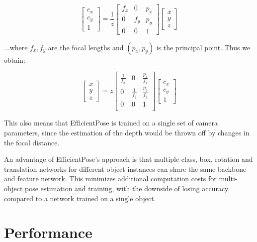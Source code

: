 \begin{equation}
    \begin{bmatrix}
        c_x\\c_y\\1
    \end{bmatrix}
    = \frac{1}{z}
    \begin{bmatrix}
        f_x & 0 & p_x \\
        0 & f_y & p_y \\
        0 & 0 & 1 
    \end{bmatrix}
    \begin{bmatrix}
        x\\y\\z
    \end{bmatrix}
\end{equation}

...where $f_x, f_y$ are the focal lengths and $(p_x, p_y)$ is the principal point. Thus we obtain:

\begin{equation}
    \begin{bmatrix}
        x\\y\\z
    \end{bmatrix}
    =z
    \begin{bmatrix}
        \frac{1}{f_x} & 0 & \frac{p_x}{f_x} \\
        0 & \frac{1}{f_y} & \frac{p_y}{f_y} \\
        0 & 0 & 1 \\
    \end{bmatrix}
    \begin{bmatrix}
        c_x\\c_y\\1
    \end{bmatrix}
\end{equation}

This also means that EfficientPose is trained on a single set of camera parameters, since the estimation of the depth would be thrown off by changes in the focal distance.

An advantage of EfficientPose's approach is that multiple class, box, rotation and translation networks for different object instances can share the same backbone and feature network. This minimizes additional computation costs for multi-object pose estimation and training, with the downside of losing accuracy compared to a network trained on a single object. 

\section{Performance}

